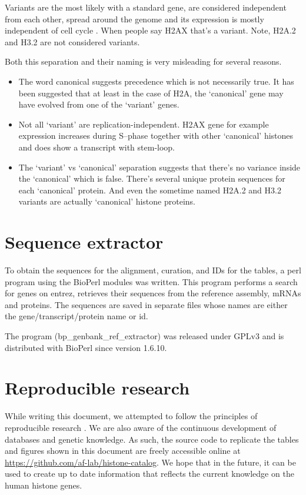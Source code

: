 \documentclass[10pt,a4paper,draft,article]{memoir}
\newcommand{\addref}[1][]{\todo[color=red!40,size=\tiny]{Add reference: #1}}
\begin{document}
    Variants are the most likely with a standard gene, are considered independent from each other,
    spread around the genome and its expression is mostly independent of cell cycle . When people say H2AX that's
    a variant. Note, H2A.2 and H3.2 are not considered variants.

    Both this separation and their naming is very misleading 
    for several reasons.
    \begin{itemize}
      \item The word canonical suggests precedence which is not necessarily true. It has been
            suggested that at least in the case of H2A, the `canonical' gene may have evolved
            from one of the `variant' genes\addref.
      \item Not all `variant' are replication-independent. H2AX gene for example expression
            increases during S--phase together with other `canonical' histones and does show
            a transcript with stem-loop.
      \item The `variant' vs `canonical' separation suggests that there's no variance inside
            the `canonical' which is false. There's several unique protein sequences for each
            `canonical' protein. And even the sometime named H2A.2 and H3.2 variants are actually
            `canonical' histone proteins.
    \end{itemize}

  \section{Sequence extractor}
    To obtain the sequences for the alignment, curation, and IDs for the tables, a perl program using the
    BioPerl modules was written. This program performs a search for genes on entrez, retrieves
    their sequences from the reference assembly, mRNAs and proteins. The sequences are saved in separate files whose
    names are either the gene/transcript/protein name or id.

    The program (bp\_genbank\_ref\_extractor) was released under GPLv3 and is distributed with
    BioPerl since version 1.6.10.

  \section{Reproducible research}
  \label{sec:reproducible}
    While writing this document, we attempted to follow the principles of reproducible research
    \citep{reproducible-research-bioinformatics, reproducible-research-law}.
    We are also aware of the continuous development of databases and genetic knowledge. As such,
    the source code to replicate the tables and figures shown in this document are freely accessible
    online at \url{https://github.com/af-lab/histone-catalog}. We hope that in the future, it can
    be used to create up to date information
    that reflects the current knowledge on the human histone genes.
\end{document}
